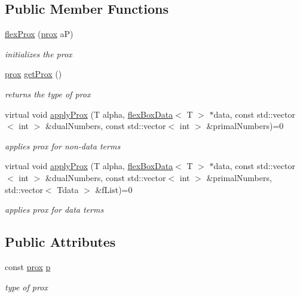 \subsection*{Public Member Functions}
\begin{DoxyCompactItemize}
\item 
\hyperlink{classflex_prox_a6055dee6acc0a2eedebf11c6ee4b644b}{flex\+Prox} (\hyperlink{tools_8h_aa34fd4f0962337a24e898ac0abdfff22}{prox} aP)
\begin{DoxyCompactList}\small\item\em initializes the prox \end{DoxyCompactList}\item 
\hyperlink{tools_8h_aa34fd4f0962337a24e898ac0abdfff22}{prox} \hyperlink{classflex_prox_a86e900bae3979620dcc6de3a5da89c8e}{get\+Prox} ()
\begin{DoxyCompactList}\small\item\em returns the type of prox \end{DoxyCompactList}\item 
virtual void \hyperlink{classflex_prox_a6d3119bd368c4216ad264a1f6dc1d01f}{apply\+Prox} (T alpha, \hyperlink{classflex_box_data}{flex\+Box\+Data}$<$ T $>$ $\ast$data, const std\+::vector$<$ int $>$ \&dual\+Numbers, const std\+::vector$<$ int $>$ \&primal\+Numbers)=0
\begin{DoxyCompactList}\small\item\em applies prox for non-\/data terms \end{DoxyCompactList}\item 
virtual void \hyperlink{classflex_prox_aec433ffbf1a7586f26a2116c6b94bdd6}{apply\+Prox} (T alpha, \hyperlink{classflex_box_data}{flex\+Box\+Data}$<$ T $>$ $\ast$data, const std\+::vector$<$ int $>$ \&dual\+Numbers, const std\+::vector$<$ int $>$ \&primal\+Numbers, std\+::vector$<$ Tdata $>$ \&f\+List)=0
\begin{DoxyCompactList}\small\item\em applies prox for data terms \end{DoxyCompactList}\end{DoxyCompactItemize}
\subsection*{Public Attributes}
\begin{DoxyCompactItemize}
\item 
const \hyperlink{tools_8h_aa34fd4f0962337a24e898ac0abdfff22}{prox} \hyperlink{classflex_prox_a5e62beeddd95e33d0a55319a05f44855}{p}
\begin{DoxyCompactList}\small\item\em type of prox \end{DoxyCompactList}\end{DoxyCompactItemize}


